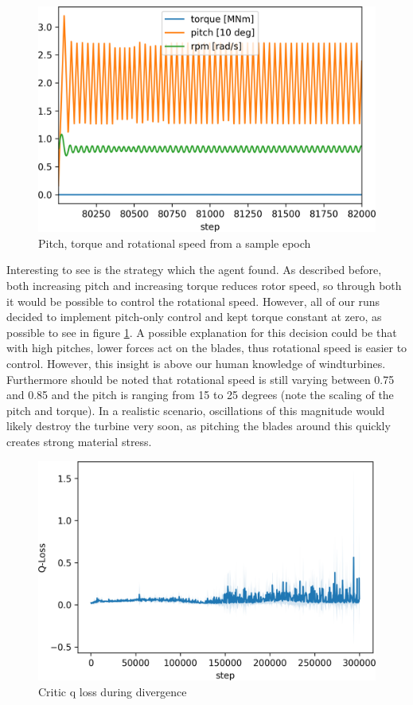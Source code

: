 \documentclass[hyperref,beleg]{cgvpub}
\begin{document}
\begin{figure}
  \centering
  \includegraphics[width=0.5\linewidth]{images/epoch40.png}
  \caption{Pitch, torque and rotational speed from a sample epoch}
  \label{fig:strategy}
\end{figure}

Interesting to see is the strategy which the agent found. As described before, both increasing pitch and increasing torque reduces rotor speed, so through both it would be possible to control the rotational speed. However, all of our runs decided to implement pitch-only control and kept torque constant at zero, as possible to see in figure \ref{fig:strategy}. A possible explanation for this decision could be that with high pitches, lower forces act on the blades, thus rotational speed is easier to control. However, this insight is above our human knowledge of windturbines. Furthermore should be noted that rotational speed is still varying between 0.75 and 0.85 and the pitch is ranging from 15 to 25 degrees (note the scaling of the pitch and torque). In a realistic scenario, oscillations of this magnitude would likely destroy the turbine very soon, as pitching the blades around this quickly creates strong material stress. 

\begin{figure}
  \centering
  \includegraphics[width=0.5\linewidth]{images/plot_critic_1e-3_qloss.png}
  \caption{Critic q loss during divergence}
  \label{fig:critic_qloss}
\end{figure}
\end{document}

